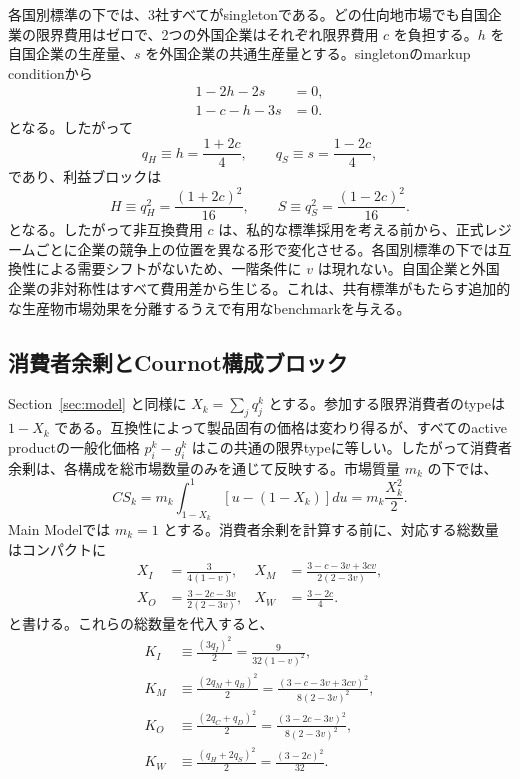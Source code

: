 各国別標準の下では、3社すべてがsingletonである。どの仕向地市場でも自国企業の限界費用はゼロで、2つの外国企業はそれぞれ限界費用 $c$ を負担する。$h$ を自国企業の生産量、$s$ を外国企業の共通生産量とする。singletonのmarkup conditionから
\begin{align}
    1-2h-2s&=0, \label{eq:foc-sw-native}\\
    1-c-h-3s&=0. \label{eq:foc-sw-foreign}
\end{align}
となる。したがって
\begin{equation}
    q_H\equiv h=\frac{1+2c}{4},
    \qquad
    q_S\equiv s=\frac{1-2c}{4},
    \label{eq:quantities-sw}
\end{equation}
であり、利益ブロックは
\begin{equation}
    H\equiv q_H^2=\frac{(1+2c)^2}{16},
    \qquad
    S\equiv q_S^2=\frac{(1-2c)^2}{16}.
    \label{eq:profits-sw}
\end{equation}
となる。したがって非互換費用 $c$ は、私的な標準採用を考える前から、正式レジームごとに企業の競争上の位置を異なる形で変化させる。各国別標準の下では互換性による需要シフトがないため、一階条件に $v$ は現れない。自国企業と外国企業の非対称性はすべて費用差から生じる。これは、共有標準がもたらす追加的な生産物市場効果を分離するうえで有用なbenchmarkを与える。

\subsection{消費者余剰とCournot構成ブロック}
\label{subsec:product-market-blocks}

Section~\ref{sec:model} と同様に $X_k=\sum_j q_j^k$ とする。参加する限界消費者のtypeは $1-X_k$ である。互換性によって製品固有の価格は変わり得るが、すべてのactive productの一般化価格 $p_i^k-g_i^k$ はこの共通の限界typeに等しい。したがって消費者余剰は、各構成を総市場数量のみを通じて反映する。市場質量 $m_k$ の下では、
\begin{equation}
    CS_k
    =m_k\int_{1-X_k}^{1}\left[u-(1-X_k)\right]du
    =m_k\frac{X_k^2}{2}.
    \label{eq:consumer-surplus-general}
\end{equation}
Main Modelでは $m_k=1$ とする。消費者余剰を計算する前に、対応する総数量はコンパクトに
\begin{align}
    X_I&=\frac{3}{4(1-v)}, &
    X_M&=\frac{3-c-3v+3cv}{2(2-3v)}, \\
    X_O&=\frac{3-2c-3v}{2(2-3v)}, &
    X_W&=\frac{3-2c}{4}.
    \label{eq:total-quantities}
\end{align}
と書ける。これらの総数量を代入すると、
\begin{align}
    K_I&\equiv\frac{(3q_I)^2}{2}
        =\frac{9}{32(1-v)^2}, \label{eq:KI}\\
    K_M&\equiv\frac{(2q_M+q_B)^2}{2}
        =\frac{(3-c-3v+3cv)^2}{8(2-3v)^2}, \label{eq:KM}\\
    K_O&\equiv\frac{(2q_C+q_D)^2}{2}
        =\frac{(3-2c-3v)^2}{8(2-3v)^2}, \label{eq:KO}\\
    K_W&\equiv\frac{(q_H+2q_S)^2}{2}
        =\frac{(3-2c)^2}{32}. \label{eq:KW}
\end{align}


